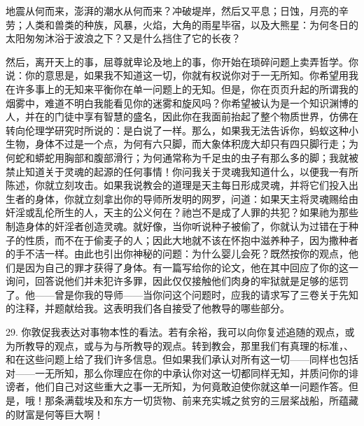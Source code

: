 地震从何而来，澎湃的潮水从何而来？\newline{}冲破堤岸，然后又平息；\newline{}日蚀，月亮的辛劳；\newline{}人类和兽类的种族，风暴，火焰，\newline{}大角的雨星毕宿，以及大熊星：\newline{}为何冬日的太阳匆匆沐浴于波浪之下？\newline{}又是什么挡住了它的长夜？\par

然后，离开天上的事，屈尊就卑论及地上的事，你开始在琐碎问题上卖弄哲学。你说：你的意思是，如果我不知道这一切，你就有权说你对于一无所知。你希望用我在许多事上的无知来平衡你在单一问题上的无知。但是，你在页页升起的所谓我的烟雾中，难道不明白我能看见你的迷雾和旋风吗？你希望被认为是一个知识渊博的人，并在的门徒中享有智慧的盛名，因此你在我面前抬起了整个物质世界，仿佛在转向伦理学研究时所说的：是白说了一样。那么，如果我无法告诉你，蚂蚁这种小生物，身体不过是一个点，为何有六只脚，而大象体积庞大却只有四只脚行走；为何蛇和蟒蛇用胸部和腹部滑行；为何通常称为千足虫的虫子有那么多的脚；我就被禁止知道关于灵魂的起源的任何事情！你问我关于灵魂我知道什么，以便我一有所陈述，你就立刻攻击。如果我说教会的道理是天主每日形成灵魂，并将它们投入出生者的身体，你就立刻拿出你的导师所发明的网罗，问道：如果天主将灵魂赐给由奸淫或乱伦所生的人，天主的公义何在？祂岂不是成了人罪的共犯？如果祂为那些制造身体的奸淫者创造灵魂。就好像，当你听说种子被偷了，你就认为过错在于种子的性质，而不在于偷麦子的人；因此大地就不该在怀抱中滋养种子，因为撒种者的手不洁一样。由此也引出你神秘的问题：为什么婴儿会死？既然按你的观点，他们是因为自己的罪才获得了身体。有一篇写给你的论文，他在其中回应了你的这一询问，回答说他们并未犯许多罪，因此仅仅接触他们肉身的牢狱就是足够的惩罚了。他——曾是你我的导师——当你问这个问题时，应我的请求写了三卷关于先知的注释，并题献给我。这表明我们各自接受了他教导的哪些部分。\par

29. 你敦促我表达对事物本性的看法。若有余裕，我可以向你复述追随的观点，或为所教导的观点，或与为与所教导的观点。转到教会，那里我们有真理的标准，、和在这些问题上给了我们许多信息。但如果我们承认对所有这一切——同样也包括对——一无所知，那么你理应在你的中承认你对这一切都同样无知，并质问你的诽谤者，他们自己对这些重大之事一无所知，为何竟敢迫使你就这单一问题作答。但是，哦！那条满载埃及和东方一切货物、前来充实城之贫穷的三层桨战船，所蕴藏的财富是何等巨大啊！\par

